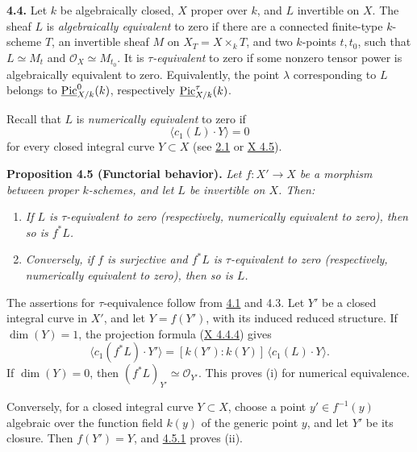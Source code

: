 \textbf{4.4.} Let \(k\) be algebraically closed, \(X\) proper over \(k\),
and \(L\) invertible on \(X\). The sheaf \(L\) is \emph{algebraically
equivalent} to zero if there are a connected finite-type \(k\)-scheme
\(T\), an invertible sheaf \(M\) on \(X_T=X\times_kT\), and two
\(k\)-points \(t,t_0\), such that \(L\simeq M_t\) and
\(\mathcal O_X\simeq M_{t_0}\). It is \emph{\(\tau\)-equivalent} to zero
if some nonzero tensor power is algebraically equivalent to zero.
Equivalently, the point \(\lambda\) corresponding to \(L\) belongs to
\(\underline{\operatorname{Pic}}^0_{X/k}(k)\), respectively
\(\underline{\operatorname{Pic}}^\tau_{X/k}(k)\).

Recall that \(L\) is \emph{numerically equivalent} to zero if
\[
\langle c_1(L)\cdot Y\rangle=0
\]
for every closed integral curve \(Y\subset X\) (see \hyperlink{sga6.e13.para.2-1}{2.1} or \hyperlink{sga6.e10.sec.4.5}{X 4.5}).

\textbf{Proposition 4.5 (Functorial behavior).} \emph{Let
\(f:X'\to X\) be a morphism between proper \(k\)-schemes, and let \(L\)
be invertible on \(X\). Then:}
\begin{enumerate}[label=(\roman*)]
\item \emph{If \(L\) is \(\tau\)-equivalent to zero (respectively,
numerically equivalent to zero), then so is \(f^*L\).}
\item \emph{Conversely, if \(f\) is surjective and \(f^*L\) is
\(\tau\)-equivalent to zero (respectively, numerically equivalent to
zero), then so is \(L\).}
\end{enumerate}

The assertions for \(\tau\)-equivalence follow from \hyperlink{sga6.e13.para.4-1}{4.1} and 4.3. Let
\(Y'\) be a closed integral curve in \(X'\), and let \(Y=f(Y')\), with
its induced reduced structure. If \(\dim(Y)=1\), the projection formula
(\hyperlink{sga6.e10.eq.4-4-4}{X 4.4.4}) gives
\begin{equation}
\langle c_1(f^*L)\cdot Y'\rangle
=[k(Y'):k(Y)]\,\langle c_1(L)\cdot Y\rangle.
\tag{4.5.1}
\end{equation}
If \(\dim(Y)=0\), then \((f^*L)_{Y'}\simeq\mathcal O_{Y'}\). This proves
(i) for numerical equivalence.

Conversely, for a closed integral curve \(Y\subset X\), choose a point
\(y'\in f^{-1}(y)\) algebraic over the function field \(k(y)\) of the
generic point \(y\), and let \(Y'\) be its closure. Then \(f(Y')=Y\), and
\hyperlink{sga6.e13.eq.4-5-1}{4.5.1} proves (ii).


